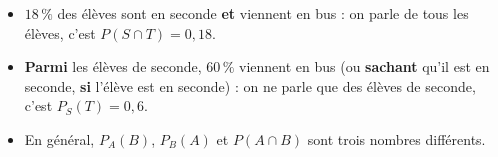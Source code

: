 \documentclass[11pt,a4paper]{article}
\begin{document}
\begin{remarquebox}
\begin{itemize}
  \item \og $18\,\%$ des élèves sont en seconde \textbf{et} viennent en bus\fg{} : on
    parle de tous les élèves, c'est $P(S\cap T)=0{,}18$.
  \item \og \textbf{Parmi} les élèves de seconde, $60\,\%$ viennent en bus\fg{} (ou
    \og \textbf{sachant} qu'il est en seconde\fg, \og \textbf{si} l'élève est en
    seconde\fg) : on ne parle que des élèves de seconde, c'est $P_{S}(T)=0{,}6$.
  \item En général, $P_{A}(B)$, $P_{B}(A)$ et $P(A\cap B)$ sont trois nombres différents.
\end{itemize}
\end{remarquebox}
\end{document}
